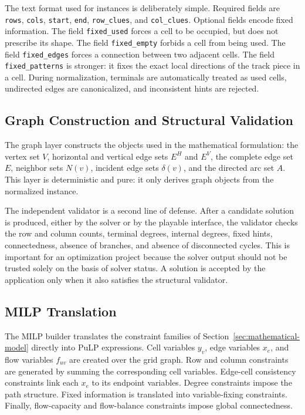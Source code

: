 The text format used for instances is deliberately simple. Required fields are
\texttt{rows}, \texttt{cols}, \texttt{start}, \texttt{end},
\texttt{row\_clues}, and \texttt{col\_clues}. Optional fields encode fixed
information. The field \texttt{fixed\_used} forces a cell to be occupied, but
does not prescribe its shape. The field \texttt{fixed\_empty} forbids a cell
from being used. The field \texttt{fixed\_edges} forces a connection between
two adjacent cells. The field \texttt{fixed\_patterns} is stronger: it fixes
the exact local directions of the track piece in a cell. During normalization,
terminals are automatically treated as used cells, undirected edges are
canonicalized, and inconsistent hints are rejected.

\subsection{Graph Construction and Structural Validation}

The graph layer constructs the objects used in the mathematical formulation:
the vertex set \(V\), horizontal and vertical edge sets \(E^H\) and \(E^V\),
the complete edge set \(E\), neighbor sets \(N(v)\), incident edge sets
\(\delta(v)\), and the directed arc set \(A\). This layer is deterministic and
pure: it only derives graph objects from the normalized instance.

The independent validator is a second line of defense. After a candidate
solution is produced, either by the solver or by the playable interface, the
validator checks the row and column counts, terminal degrees, internal
degrees, fixed hints, connectedness, absence of branches, and absence of
disconnected cycles. This is important for an optimization project because the
solver output should not be trusted solely on the basis of solver status. A
solution is accepted by the application only when it also satisfies the
structural validator.

\subsection{MILP Translation}

The MILP builder translates the constraint families of
Section~\ref{sec:mathematical-model} directly into PuLP expressions. Cell
variables \(y_v\), edge variables \(x_e\), and flow variables \(f_{uv}\) are
created over the grid graph. Row and column constraints are generated by
summing the corresponding cell variables. Edge-cell consistency constraints
link each \(x_e\) to its endpoint variables. Degree constraints impose the
path structure. Fixed information is translated into variable-fixing
constraints. Finally, flow-capacity and flow-balance constraints impose global
connectedness.

